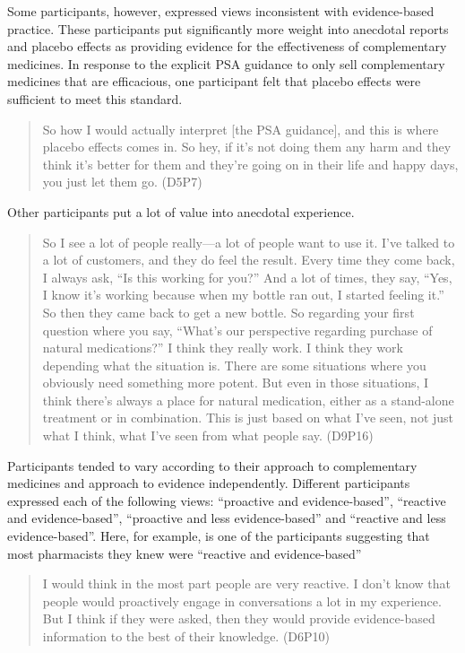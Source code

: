 \documentclass[11pt,a4paper]{article}
\begin{document}
Some participants, however, expressed views inconsistent with
evidence-based practice. These participants put significantly more
weight into anecdotal reports and placebo effects as providing evidence
for the effectiveness of complementary medicines. In response to the
explicit PSA guidance to only sell complementary medicines that are
efficacious, one participant felt that placebo effects were sufficient
to meet this standard.

\begin{quote}
So how I would actually interpret {[}the PSA guidance{]}, and this is
where placebo effects comes in. So hey, if it's not doing them any harm
and they think it's better for them and they're going on in their life
and happy days, you just let them go. (D5P7)
\end{quote}

Other participants put a lot of value into anecdotal experience.

\begin{quote}
So I see a lot of people really---a lot of people want to use it. I've
talked to a lot of customers, and they do feel the result. Every time
they come back, I always ask, ``Is this working for you?'' And a lot of
times, they say, ``Yes, I know it's working because when my bottle ran
out, I started feeling it.'' So then they came back to get a new bottle.
So regarding your first question where you say, ``What's our perspective
regarding purchase of natural medications?'' I think they really work. I
think they work depending what the situation is. There are some
situations where you obviously need something more potent. But even in
those situations, I think there's always a place for natural medication,
either as a stand-alone treatment or in combination. This is just based
on what I've seen, not just what I think, what I've seen from what
people say. (D9P16)
\end{quote}

Participants tended to vary according to their approach to complementary
medicines and approach to evidence independently. Different participants
expressed each of the following views: ``proactive and evidence-based'',
``reactive and evidence-based'', ``proactive and less evidence-based''
and ``reactive and less evidence-based''. Here, for example, is one of
the participants suggesting that most pharmacists they knew were
``reactive and evidence-based''

\begin{quote}
I would think in the most part people are very reactive. I don't know
that people would proactively engage in conversations a lot in my
experience. But I think if they were asked, then they would provide
evidence-based information to the best of their knowledge. (D6P10)
\end{quote}
\end{document}
